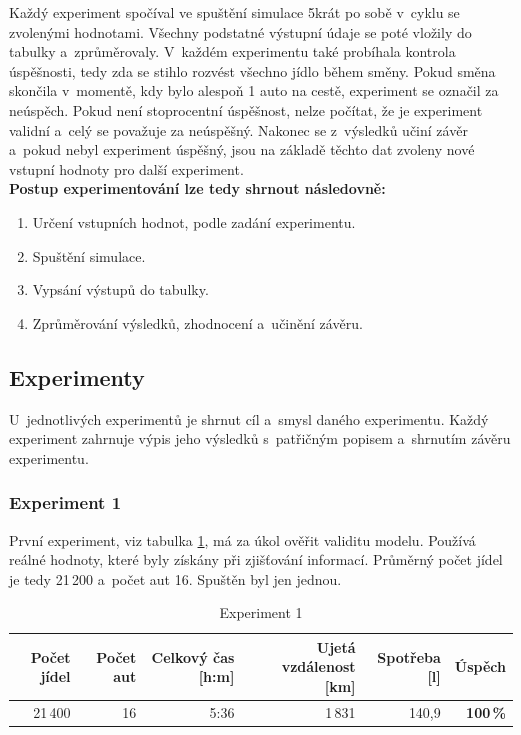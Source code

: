 \documentclass[a4paper, 11pt]{article}
\begin{document}
	Každý experiment spočíval ve spuštění simulace 5krát po sobě v~cyklu se
	zvolenými hodnotami. Všechny podstatné výstupní údaje se poté vložily do
	tabulky a~zprůměrovaly. V~každém experimentu také probíhala kontrola
	úspěšnosti, tedy zda se stihlo rozvést všechno jídlo během směny. Pokud
	směna skončila v~momentě, kdy bylo alespoň 1 auto na cestě, experiment se
	označil za neúspěch. Pokud není stoprocentní úspěšnost, nelze počítat,
	že je experiment validní a~celý se považuje za neúspěšný. Nakonec se
	z~výsledků učiní závěr a~pokud nebyl experiment úspěšný, jsou na základě
	těchto dat zvoleny nové vstupní hodnoty pro další experiment. \\

	\textbf{Postup experimentování lze tedy shrnout následovně:}
	\begin{enumerate}
		\item Určení vstupních hodnot, podle zadání experimentu.
		\item Spuštění simulace.
		\item Vypsání výstupů do tabulky.
		\item Zprůměrování výsledků, zhodnocení a~učinění závěru.
	\end{enumerate}


	\subsection{Experimenty}
	\label{sectiion:experiments}

	U~jednotlivých experimentů je shrnut cíl a~smysl daného experimentu.
	Každý experiment zahrnuje výpis jeho výsledků s~patřičným popisem
	a~shrnutím závěru experimentu.


	\subsubsection{Experiment 1}
	\label{section:experiment1}

	První experiment, viz tabulka \ref{table:experiment1}, má za úkol ověřit
	validitu modelu. Používá reálné hodnoty, které byly získány při zjišťování
	informací. Průměrný počet jídel je tedy 21\,200 a~počet aut 16. Spuštěn
	byl jen jednou.

	\begin{table}[ht]
		\centering
		\begin{tabular}{|r|r|r|r|r|r|}
			\hline
			Počet jídel & Počet aut & Celkový čas [h:m]
				& Ujetá vzdálenost [km] & Spotřeba [l]
				& \textbf{Úspěch} \\ \hline

			21\,400 & 16 & 5:36 & 1\,831 & 140,9 & \textbf{100\,\%} \\ \hline
		\end{tabular}

		\caption{Experiment 1}
		\label{table:experiment1}
	\end{table}
\end{document}

